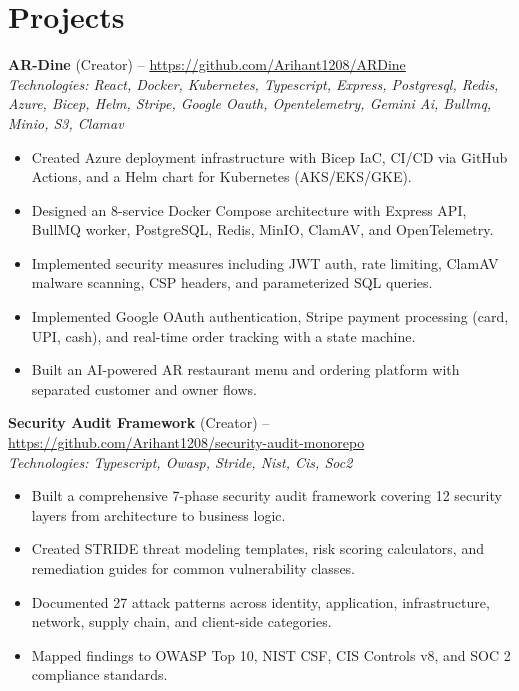 \documentclass[11pt,a4paper]{article}
\begin{document}
\section{Projects}
\textbf{AR-Dine} (Creator) -- \href{https://github.com/Arihant1208/ARDine}{https://github.com/Arihant1208/ARDine}
\\ \textit{Technologies: React, Docker, Kubernetes, Typescript, Express, Postgresql, Redis, Azure, Bicep, Helm, Stripe, Google Oauth, Opentelemetry, Gemini Ai, Bullmq, Minio, S3, Clamav}
\begin{itemize}
  \item Created Azure deployment infrastructure with Bicep IaC, CI/CD via GitHub Actions, and a Helm chart for Kubernetes (AKS/EKS/GKE).
  \item Designed an 8-service Docker Compose architecture with Express API, BullMQ worker, PostgreSQL, Redis, MinIO, ClamAV, and OpenTelemetry.
  \item Implemented security measures including JWT auth, rate limiting, ClamAV malware scanning, CSP headers, and parameterized SQL queries.
  \item Implemented Google OAuth authentication, Stripe payment processing (card, UPI, cash), and real-time order tracking with a state machine.
  \item Built an AI-powered AR restaurant menu and ordering platform with separated customer and owner flows.
\end{itemize}
\vspace{2pt}
\textbf{Security Audit Framework} (Creator) -- \href{https://github.com/Arihant1208/security-audit-monorepo}{https://github.com/Arihant1208/security-audit-monorepo}
\\ \textit{Technologies: Typescript, Owasp, Stride, Nist, Cis, Soc2}
\begin{itemize}
  \item Built a comprehensive 7-phase security audit framework covering 12 security layers from architecture to business logic.
  \item Created STRIDE threat modeling templates, risk scoring calculators, and remediation guides for common vulnerability classes.
  \item Documented 27 attack patterns across identity, application, infrastructure, network, supply chain, and client-side categories.
  \item Mapped findings to OWASP Top 10, NIST CSF, CIS Controls v8, and SOC 2 compliance standards.
\end{itemize}
\end{document}
